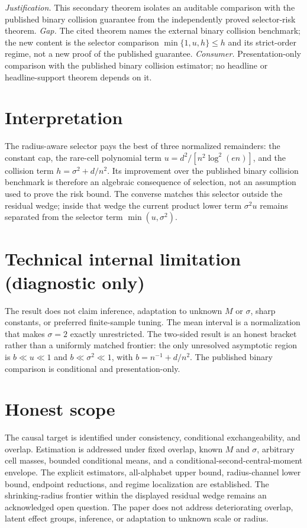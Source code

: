 \documentclass{article}
\begin{document}
\par\smallskip\noindent \textit{Justification.} This secondary theorem isolates an auditable comparison with the published binary collision guarantee from the independently proved selector-risk theorem. \textit{Gap.} The cited theorem names the external binary collision benchmark; the new content is the selector comparison \(\min\{1,u,h\}\le h\) and its strict-order regime, not a new proof of the published guarantee. \textit{Consumer.} Presentation-only comparison with the published binary collision estimator; no headline or headline-support theorem depends on it.

\section{Interpretation}

The radius-aware selector pays the best of three normalized remainders: the constant cap, the rare-cell polynomial term \(u=d^2/[n^2\log^2(en)]\), and the collision term \(h=\sigma^2+d/n^2\).  Its improvement over the published binary collision benchmark is therefore an algebraic consequence of selection, not an assumption used to prove the risk bound.  The converse matches this selector outside the residual wedge; inside that wedge the current product lower term \(\sigma^2u\) remains separated from the selector term \(\min(u,\sigma^2)\).

\section*{Technical internal limitation (diagnostic only)}

The result does not claim inference, adaptation to unknown \(M\) or \(\sigma\), sharp constants, or preferred finite-sample tuning.  The mean interval is a normalization that makes \(\sigma=2\) exactly unrestricted.  The two-sided result is an honest bracket rather than a uniformly matched frontier: the only unresolved asymptotic region is \(b\ll u\ll1\) and \(b\ll\sigma^2\ll1\), with \(b=n^{-1}+d/n^2\).  The published binary comparison is conditional and presentation-only.

\section{Honest scope}

The causal target is identified under consistency, conditional exchangeability, and overlap.  Estimation is addressed under fixed overlap, known \(M\) and \(\sigma\), arbitrary cell masses, bounded conditional means, and a conditional-second-central-moment envelope.  The explicit estimators, all-alphabet upper bound, radius-channel lower bound, endpoint reductions, and regime localization are established.  The shrinking-radius frontier within the displayed residual wedge remains an acknowledged open question.  The paper does not address deteriorating overlap, latent effect groups, inference, or adaptation to unknown scale or radius.
\end{document}
